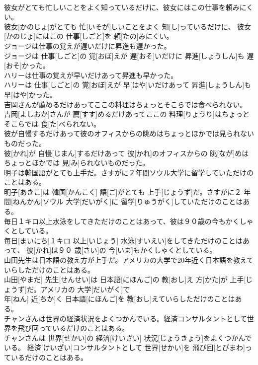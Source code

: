 \documentclass[8pt]{extreport}
\begin{document}
\begin{CJK}{UTF8}{min}
\\	彼女がとても忙しいことをよく知っているだけに、彼女にはこの仕事を頼みにくい。	
\\	彼女[かのじょ]がとても 忙[いそが]しいことをよく 知[し]っているだけに、 彼女[かのじょ]にはこの 仕事[しごと]を 頼[たの]みにくい。
\\	ジョージは仕事の覚えが遅いだけに昇進も遅かった。	
\\	ジョージは 仕事[しごと]の 覚[おぼ]えが 遅[おそ]いだけに 昇進[しょうしん]も 遅[おそ]かった。
\\	ハリーは仕事の覚えが早いだけあって昇進も早かった。	
\\	ハリーは 仕事[しごと]の 覚[おぼ]えが 早[はや]いだけあって 昇進[しょうしん]も 早[はや]かった。
\\	吉岡さんが薦めるだけあってここの料理はちょっとそこらでは食べられない。	
\\	吉岡[よしおか]さんが 薦[すす]めるだけあってここの 料理[りょうり]はちょっとそこらでは 食[た]べられない。
\\	彼が自慢するだけあって彼のオフィスからの眺めはちょっとほかでは見られないものだった。	
\\	彼[かれ]が 自慢[じまん]するだけあって 彼[かれ]のオフィスからの 眺[なが]めはちょっとほかでは 見[み]られないものだった。
\\	明子は韓国語がとても上手だ。さすがに２年間ソウル大学に留学していただけのことはある。	
\\	明子[あきこ]は 韓国[かんこく] 語[ご]がとても 上手[じょうず]だ。さすがに２ 年間[ねんかん]ソウル 大学[だいがく]に 留学[りゅうがく]していただけのことはある。
\\	毎日１キロ以上水泳をしてきただけのことはあって、彼は９０歳の今もかくしゃくとしている。	
\\	毎日[まいにち]１キロ 以上[いじょう] 水泳[すいえい]をしてきただけのことはあって、 彼[かれ]は９０ 歳[さい]の 今[いま]もかくしゃくとしている。
\\	山田先生は日本語の教え方が上手だ。アメリカの大学で20年近く日本語を教えていらしただけのことはある。	
\\	山田[やまだ] 先生[せんせい]は 日本語[にほんご]の 教[おし]え 方[かた]が 上手[じょうず]だ。アメリカの 大学[だいがく]で 
\\	年[ねん] 近[ちか]く 日本語[にほんご]を 教[おし]えていらしただけのことはある。
\\	チャンさんは世界の経済状況をよくつかんでいる。経済コンサルタントとして世界を飛び回っているだけのことはある。	
\\	チャンさんは 世界[せかい]の 経済[けいざい] 状況[じょうきょう]をよくつかんでいる。 経済[けいざい]コンサルタントとして 世界[せかい]を 飛び回[とびまわ]っているだけのことはある。

\end{CJK}
\end{document}
